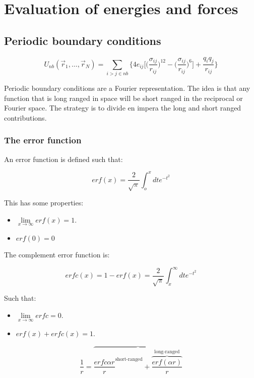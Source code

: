 \chapter{Evaluation of energies and forces}

\section{Periodic boundary conditions}

$$U_{nb}(\vec{r}_1, \dots, \vec{r}_N) = \sum\limits_{i>j\in nb}\biggl\{4e_{ij}\biggl[\biggl(\frac{\sigma_{ij}}{r_{ij}}\biggr)^{12}-\biggl(\frac{\sigma_{ij}}{r_{ij}}\biggr)^6\biggr] + \frac{q_iq_j}{r_{ij}}\biggr\}$$

Periodic boundary conditions are a Fourier representation.
The idea is that any function that is long ranged in space will be short ranged in the reciprocal or Fourier space.
The strategy is to divide en impera the long and short ranged contributions.

	\subsection{The error function}
	An error function is defined such that:

	$$erf(x) = \frac{2}{\sqrt{\pi}}\int_o^x dte^{-t^2}$$

	This has some properties:

	\begin{multicols}{2}
		\begin{itemize}
			\item $\lim\limits_{x\rightarrow \infty}erf(x) = 1$.
			\item $erf(0) = 0$
		\end{itemize}
	\end{multicols}

	The complement error function is:

	$$erfc(x) = 1- erf(x) = \frac{2}{\sqrt{\pi}}\int_x^\infty dte^{-t^2}$$

	Such that:

	\begin{multicols}{2}
		\begin{itemize}
			\item $\lim\limits_{x\rightarrow\infty} erfc = 0$.
			\item $erf(x) + erfc(x) = 1$.
		\end{itemize}
	\end{multicols}

	$$\frac{1}{r} = \overbrace{\frac{erfc{\alpha r}}{r}^{\text{short-ranged}} + \overbrace{\frac{erf(\alpha r)}{r}}^{\text{long-ranged}}}$$

